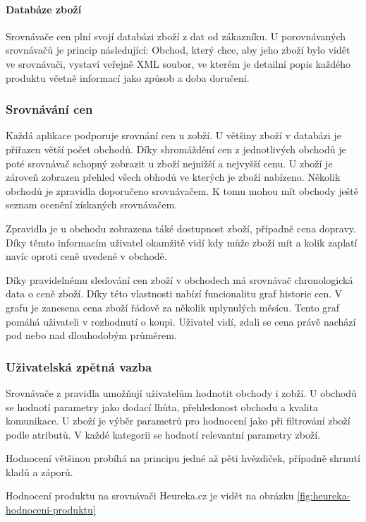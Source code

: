 \paragraph{Databáze zboží}
Srovnávače cen plní svojí databázi zboží z dat od zákazníku. U porovnávaných srovnávačů je princip následující: Obchod, který chce, aby jeho zboží bylo vidět ve srovnávači, vystaví veřejně XML soubor, ve kterém je detailní popis každého produktu včetně informací jako způsob a doba doručení.\cite{website:heureka:registrace-obchodu}

\subsubsection{Srovnávání cen}
Každá aplikace podporuje srovnání cen u zobží. U většiny zboží v databázi je přiřazen větší počet obchodů. Díky shromáždění cen z jednotlivých obchodů je poté srovnávač schopný zobrazit u zboží nejnižší a nejvyšší cenu. U zboží je zároveň zobrazen přehled všech obhodů ve kterých je zboží nabízeno. Několik obchodů je zpravidla doporučeno srovnávačem. K tomu mohou mít obchody ještě seznam ocenění získaných srovnávačem.

Zpravidla je u obchodu zobrazena táké dostupnost zboží, případně cena dopravy. Díky těmto informacím uživatel okamžitě vidí kdy může zboží mít a kolik zaplatí navíc oproti ceně uvedené v obchodě.

Díky pravidelnému sledování cen zboží v obchodech má srovnávač chronologická data o ceně zboží. Díky této vlastnosti nabízí funcionalitu graf historie cen. V grafu je zanesena cena zboží řádově za několik uplynulých měsícu. Tento graf pomáhá uživateli v rozhodnutí o koupi. Uživatel vidí, zdali se cena právě nachází pod nebo nad dlouhodobým průměrem.

\subsubsection{Uživatelská zpětná vazba}
Srovnávače z pravidla umožňují uživatelům hodnotit obchody i zobží. U obchodů se hodnotí parametry jako dodací lhůta, přehledonost obchodu a kvalita komunikace. U zboží je výběr parametrů pro hodnocení jako při filtrování zboží podle atributů. V každé kategorii se hodnotí relevantní parametry zboží. 

Hodnocení většinou probíhá na principu jedné až pěti hvězdiček, případně shrnutí kladů a záporů.

Hodnocení produktu na srovnávači Heureka.cz je vidět na obrázku \ref{fig:heureka-hodnoceni-produktu}


